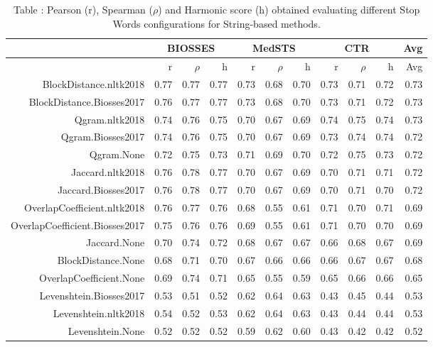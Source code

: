 \begin{table}[!h]
\centering
\caption{Table \label{table:Preprocessing_stopwords_StringMethods}: Pearson (r), Spearman ($\rho$) and Harmonic score (h) obtained evaluating different Stop Words configurations for String-based methods.} 
\begingroup\tiny
\begin{tabular}{rrrrrrrrrrr}
  \hline \multicolumn{1}{c}{ } & \multicolumn{3}{c}{BIOSSES} & \multicolumn{3}{c}{MedSTS} & \multicolumn{3}{c}{CTR} & \multicolumn{1}{c}{Avg} \\  \hline
 & r & $\rho$ & h & r & $\rho$ & h & r & $\rho$ & h & Avg \\ 
  \hline
BlockDistance.nltk2018 & 0.77 & 0.77 & 0.77 & 0.73 & 0.68 & 0.70 & 0.73 & 0.71 & 0.72 & 0.73 \\ 
  BlockDistance.Biosses2017 & 0.76 & 0.77 & 0.77 & 0.73 & 0.68 & 0.70 & 0.73 & 0.71 & 0.72 & 0.73 \\ 
  Qgram.nltk2018 & 0.74 & 0.76 & 0.75 & 0.70 & 0.67 & 0.69 & 0.74 & 0.75 & 0.74 & 0.73 \\ 
  Qgram.Biosses2017 & 0.74 & 0.76 & 0.75 & 0.70 & 0.67 & 0.69 & 0.73 & 0.74 & 0.74 & 0.72 \\ 
  Qgram.None & 0.72 & 0.75 & 0.73 & 0.71 & 0.69 & 0.70 & 0.72 & 0.75 & 0.73 & 0.72 \\ 
  Jaccard.nltk2018 & 0.76 & 0.78 & 0.77 & 0.70 & 0.67 & 0.69 & 0.70 & 0.71 & 0.71 & 0.72 \\ 
  Jaccard.Biosses2017 & 0.76 & 0.78 & 0.77 & 0.70 & 0.67 & 0.69 & 0.70 & 0.71 & 0.70 & 0.72 \\ 
  OverlapCoefficient.nltk2018 & 0.76 & 0.77 & 0.76 & 0.68 & 0.55 & 0.61 & 0.71 & 0.70 & 0.71 & 0.69 \\ 
  OverlapCoefficient.Biosses2017 & 0.75 & 0.76 & 0.76 & 0.69 & 0.55 & 0.61 & 0.71 & 0.70 & 0.70 & 0.69 \\ 
  Jaccard.None & 0.70 & 0.74 & 0.72 & 0.68 & 0.67 & 0.67 & 0.66 & 0.68 & 0.67 & 0.69 \\ 
  BlockDistance.None & 0.68 & 0.71 & 0.70 & 0.67 & 0.66 & 0.66 & 0.66 & 0.67 & 0.67 & 0.68 \\ 
  OverlapCoefficient.None & 0.69 & 0.74 & 0.71 & 0.65 & 0.55 & 0.59 & 0.65 & 0.66 & 0.66 & 0.65 \\ 
  Levenshtein.Biosses2017 & 0.53 & 0.51 & 0.52 & 0.62 & 0.64 & 0.63 & 0.43 & 0.45 & 0.44 & 0.53 \\ 
  Levenshtein.nltk2018 & 0.54 & 0.52 & 0.53 & 0.62 & 0.64 & 0.63 & 0.43 & 0.44 & 0.44 & 0.53 \\ 
  Levenshtein.None & 0.52 & 0.52 & 0.52 & 0.59 & 0.62 & 0.60 & 0.43 & 0.42 & 0.42 & 0.52 \\ 
   \hline
\end{tabular}
\endgroup
\end{table}
